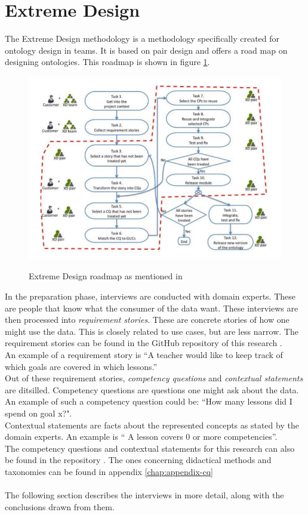 \documentclass[a4paper]{report}
\begin{document}
    \section{Extreme Design}
    The Extreme Design methodology \cite{xd} is a methodology specifically created for ontology design in teams. It is based on pair design and offers a road map on designing ontologies. This roadmap is shown in figure \ref{fig:xd-diagram}.
    \begin{figure}
        \caption[Extreme Design roadmap]{Extreme Design roadmap as mentioned in \cite{xd}}
        \centering
        \includegraphics[scale=0.75]{xd-diagram.PNG}
        \label{fig:xd-diagram}
    \end{figure}
    In the preparation phase, interviews are conducted with domain experts. These are people that know what the consumer of the data want.
    These interviews are then processed into \textit{requirement stories}. These are concrete stories of how one might use the data. 
    This is closely related to use cases, but are less narrow. The requirement stories can be found in the GitHub repository of this research \cite{repo}. \\
    An example of a requirement story is ``A teacher would like to keep track of which goals are covered in which lessons.'' \\
    Out of these requirement stories, \textit{competency questions} and \textit{contextual statements} are ditsilled. Competency questions are questions one might ask about the data. An example of such a competency question could be: ``How many lessons did I spend on goal x?".\\
    Contextual statements are facts about the represented concepts as stated by the domain experts. An example is `` A lesson covers 0 or more competencies''.\\
    The competency questions and contextual statements for this research can also be found in the repository \cite{repo}.
    The ones concerning didactical methods and taxonomies can be found in appendix \ref{chap:appendix-cq} \\ \\
    The following section describes the interviews in more detail, along with the conclusions drawn from them.
\end{document}
